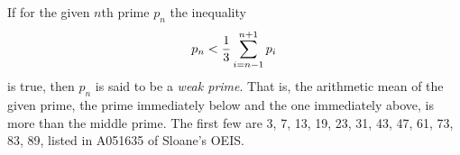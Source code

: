 \documentclass[12pt]{article}
\begin{document}
If for the given $n$th prime $p_n$ the inequality $$p_n < {1 \over 3} \sum_{i = n - 1}^{n + 1} p_i$$ is true, then $p_n$ is said to be a {\em weak prime}. That is, the arithmetic mean of the given prime, the prime immediately below and the one immediately above, is more than the middle prime. The first few are 3, 7, 13, 19, 23, 31, 43, 47, 61, 73, 83, 89, listed in  A051635 of Sloane's OEIS.
\end{document}
